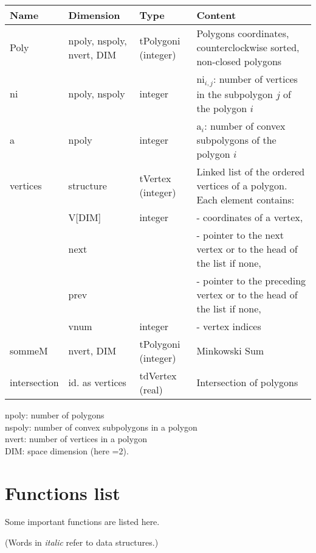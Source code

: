 \footnotesize
\begin{tabular}{|p{1.5cm}|p{3.5cm}|p{3.5cm}|p{5cm}|} \hline
{\bf Name} & {\bf Dimension} & {\bf Type} & {\bf Content} \\ \hline
Poly & npoly, nspoly, nvert, DIM &   tPolygoni (integer) & Polygons
coordinates, counterclockwise sorted, non-closed polygons  \\ \hline
ni & npoly, nspoly &   integer & ni$_{i,j}$: number of vertices 
in the subpolygon $j$ of the polygon $i$ \\ \hline
a & npoly &  integer & a$_i$: number of convex subpolygons
of the polygon $i$  \\ \hline
vertices & structure & tVertex (integer) & Linked list of the
ordered vertices of a polygon. Each element contains: \\ \cline{2-4}
 & V[DIM] & integer  & - coordinates of a vertex,  \\ \cline{2-4}
 & next & & - pointer to the next vertex
or to the head of the list if none, \\\cline{2-4}
& prev & & - pointer to the preceding vertex
or to the head of the list if none, \\\cline{2-4}
& vnum  & integer & - vertex indices   \\ \hline
sommeM & nvert, DIM & tPolygoni (integer) &   Minkowski Sum \\ \hline
intersection & id. as vertices & tdVertex (real) & Intersection of polygons \\ \hline
\end{tabular}
\newline
\noindent
npoly: number of polygons \\
nspoly: number of convex subpolygons in a polygon\\
nvert: number of vertices in a polygon\\
DIM: space dimension (here =2).

\normalsize

\newpage
\section{Functions list }
\label{liste:prog}
Some important functions are listed here.

(Words in {\em italic} refer to data structures.)

